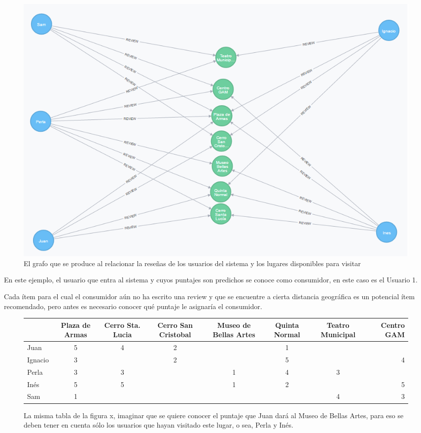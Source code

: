 \begin{figure}[hbtp]
\centering
\includegraphics[scale=0.8]{images/examplegraph.png}
\caption{El grafo que se produce al relacionar la reseñas de los usuarios del sistema y los lugares disponibles para visitar}
\end{figure}  

En este ejemplo, el usuario que entra al sistema y cuyos puntajes son predichos se conoce como consumidor, en este caso es el Usuario 1.

Cada ítem para el cual el consumidor aún no ha escrito una review y que se encuentre a cierta distancia geográfica es un potencial ítem recomendado, pero antes es necesario conocer qué puntaje le asignaría el consumidor.

\begin{figure}
\centering
\begin{adjustbox}{max width=\textwidth}
\begin{tabular}{l*{6}{c}r}
                  & Plaza de Armas & Cerro Sta. Lucia & Cerro San Cristobal & Museo de Bellas Artes & Quinta Normal  & Teatro Municipal & Centro GAM \\
\hline
\rowcolor{yellow} Juan          & 5 & 4 & 2 &   & 1 &   &   \\
\hline
Ignacio       & 3 &   & 2 &   & 5 &   & 4 \\
\hline
\rowcolor{yellow}Perla         & 3 & 3 &   & 1 & 4 & 3 &   \\
\hline
\rowcolor{yellow}Inés          & 5 & 5 &   & 1 & 2 &   & 5 \\
Sam          & 1 &  &   &  &  & 4  & 3 \\


\end{tabular}
\end{adjustbox}
\caption{La misma tabla de la figura x, imaginar que se quiere conocer el puntaje que Juan dará al Museo de Bellas Artes, para eso se deben tener en cuenta sólo los usuarios que hayan visitado este lugar, o sea, Perla y Inés.}

\end{figure}

